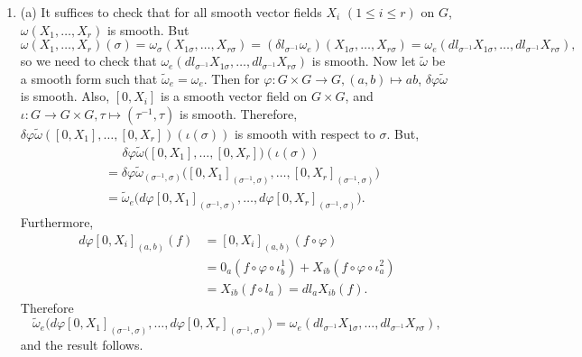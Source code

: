 \begin{enumerate}
(b) Trivial Lie bracket trivially satisfies the conditions.

(c) \[[B, A]=B A-A B=-[A, B],\]
and \begin{align*}
[[A, B], C]+[[B, C], A]+[[C, A], B]
&=A B C-B A C-C A B+C B A\\
&+B C A-C B A-A B C+A C B\\
&+C A B-A C B-B C A+B A C=0.
\end{align*}
(d) $[ax+by, cx+dy]=(ad-bc) y$. It is a Lie algebra by direct calculation.

(e) Cross product also satisfies the conditions. 
Note that $(a \times b) \times c=b(a \cdot c)-a(b \cdot c)$.
\item (a) It suffices to check that for all smooth vector fields $X_{i}$ $(1 \leq i \leq r)$ on $G$, $\omega(X_{1}, \ldots, X_{r})$ is smooth. But
\[\omega(X_{1}, \ldots, X_{r})(\sigma)=\omega_{\sigma}(X_{1 \sigma}, \ldots, X_{r \sigma})
=(\delta l_{\sigma^{-1}} \omega_{e})(X_{1 \sigma}, \ldots, X_{r \sigma})
=\omega_{e}(d l_{\sigma^{-1}} X_{1 \sigma}, \ldots, d l_{\sigma^{-1}} X_{r \sigma}),\]
so we need to check that $\omega_{e}(d l_{\sigma^{-1}} X_{1 \sigma}, \ldots, d l_{\sigma^{-1}} X_{r \sigma})$ is smooth. 
Now let $\tilde{\omega}$ be a smooth form such that $\tilde{\omega}_{e}=\omega_{e}$. 
Then for $\varphi\colon G \times G \rightarrow G,(a, b) \mapsto a b$, $\delta \varphi \tilde{\omega}$ is smooth. 
Also, $\left[0, X_{i}\right]$ is a smooth vector field on $G \times G$, 
and $\iota\colon G \rightarrow G \times G, \tau \mapsto(\tau^{-1}, \tau)$ is smooth. 
Therefore, $\delta \varphi \tilde{\omega}([0, X_{1}], \ldots,[0, X_{r}])(\iota(\sigma))$ is smooth with respect to $\sigma$. 
But,
\begin{align*}
&\quad\ \,\delta \varphi \tilde{\omega}\big([0, X_{1}], \ldots,[0, X_{r}]\big)(\iota(\sigma))\\
&=\delta \varphi \tilde{\omega}_{(\sigma^{-1}, \sigma)}\big([0, X_{1}]_{(\sigma^{-1}, \sigma)}, \ldots,[0, X_{r}]_{(\sigma^{-1}, \sigma)}\big)\\
&=\tilde{\omega}_{e}\big(d \varphi[0, X_{1}]_{(\sigma^{-1}, \sigma)}, \ldots, d \varphi[0, X_{r}]_{(\sigma^{-1}, \sigma)}\big).
\end{align*}
Furthermore,
\begin{align*}
d \varphi[0, X_{i}]_{(a, b)}(f)&=[0, X_{i}]_{(a, b)}(f \circ \varphi)\\
&=0_{a}(f \circ \varphi \circ \iota_{b}^{1})+X_{ib}(f \circ \varphi \circ \iota_{a}^{2})\\
&=X_{ib}(f \circ l_{a})=d l_{a} X_{ib}(f).
\end{align*}
Therefore
\[\tilde{\omega}_{e}\big(d \varphi[0, X_{1}]_{(\sigma^{-1}, \sigma)}, \ldots, d \varphi[0, X_{r}]_{(\sigma^{-1}, \sigma)}\big)
=\omega_{e}(d l_{\sigma^{-1}} X_{1 \sigma}, \ldots, d l_{\sigma^{-1}} X_{r \sigma}),\]
and the result follows.


\end{enumerate}
